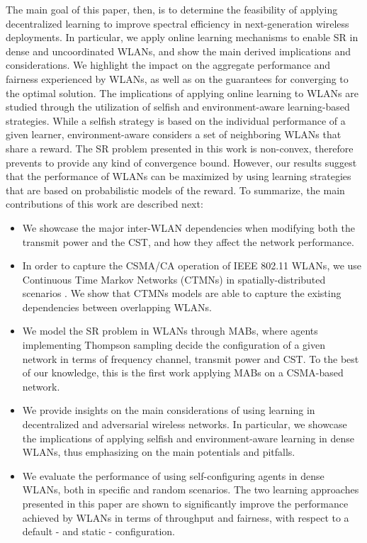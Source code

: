 \documentclass{article}
\begin{document}
The main goal of this paper, then, is to determine the feasibility of applying decentralized learning to improve spectral efficiency in next-generation wireless deployments. In particular, we apply online learning mechanisms to enable SR in dense and uncoordinated WLANs, and show the main derived implications and considerations. We highlight the impact on the aggregate performance and fairness experienced by WLANs, as well as on the guarantees for converging to the optimal solution. The implications of applying online learning to WLANs are studied through the utilization of selfish and environment-aware learning-based strategies. While a selfish strategy is based on the individual performance of a given learner, environment-aware considers a set of neighboring WLANs that share a reward. The SR problem presented in this work is non-convex, therefore prevents to provide any kind of convergence bound. However, our results suggest that the performance of WLANs can be maximized by using learning strategies that are based on probabilistic models of the reward. To summarize, the main contributions of this work are described next:
\begin{itemize}
	\item We showcase the major inter-WLAN dependencies when modifying both the transmit power and the CST, and how they affect the network performance.
	\item In order to capture the CSMA/CA operation of IEEE 802.11 WLANs, we use Continuous Time Markov Networks (CTMNs) in spatially-distributed scenarios \cite{bellalta2017throughput}. We show that CTMNs models are able to capture the existing dependencies between overlapping WLANs. 	
	\item We model the SR problem in WLANs through MABs, where agents implementing Thompson sampling decide the configuration of a given network in terms of frequency channel, transmit power and CST. To the best of our knowledge, this is the first work applying MABs on a CSMA-based network.
	\item We provide insights on the main considerations of using learning in decentralized and adversarial wireless networks. In particular, we showcase the implications of applying selfish and environment-aware learning in dense WLANs, thus emphasizing on the main potentials and pitfalls.
	\item We evaluate the performance of using self-configuring agents in dense WLANs, both in specific and random scenarios. The two learning approaches presented in this paper are shown to significantly improve the performance achieved by WLANs in terms of throughput and fairness, with respect to a default - and static - configuration.
\end{itemize}		
\end{document}
